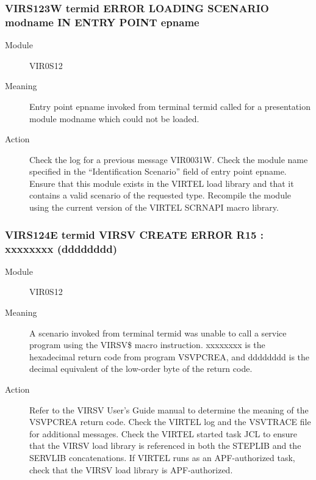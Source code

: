 \documentclass[letterpaper,10pt,english]{sphinxmanual}
\begin{document}
\subsubsection{VIRS123W termid ERROR LOADING SCENARIO modname IN ENTRY POINT epname}
\label{\detokenize{messages:virs123w-termid-error-loading-scenario-modname-in-entry-point-epname}}\begin{description}
\item[{Module}] \leavevmode
VIR0S12

\item[{Meaning}] \leavevmode
Entry point epname invoked from terminal termid called for a presentation module modname which could not be loaded.

\item[{Action}] \leavevmode
Check the log for a previous message VIR0031W. Check the module name specified in the “Identification Scenario” field of entry point epname. Ensure that this module exists in the VIRTEL load library and that it contains a valid scenario of the requested type. Recompile the module using the current version of the VIRTEL SCRNAPI macro library.

\end{description}


\subsubsection{VIRS124E termid VIRSV CREATE ERROR \textendash{} R15 : xxxxxxxx (dddddddd)}
\label{\detokenize{messages:virs124e-termid-virsv-create-error-r15-xxxxxxxx-dddddddd}}\begin{description}
\item[{Module}] \leavevmode
VIR0S12

\item[{Meaning}] \leavevmode
A scenario invoked from terminal termid was unable to call a service program using the VIRSV\$ macro instruction. xxxxxxxx is the hexadecimal return code from program VSVPCREA, and dddddddd is the decimal equivalent of the low-order byte of the return code.

\item[{Action}] \leavevmode
Refer to the VIRSV User’s Guide manual to determine the meaning of the VSVPCREA return code. Check the VIRTEL log and the VSVTRACE file for additional messages. Check the VIRTEL started task JCL to ensure that the VIRSV load library is referenced in both the STEPLIB and the SERVLIB concatenations. If VIRTEL runs as an APF-authorized task, check that the VIRSV load library is APF-authorized.

\end{description}
\end{document}
